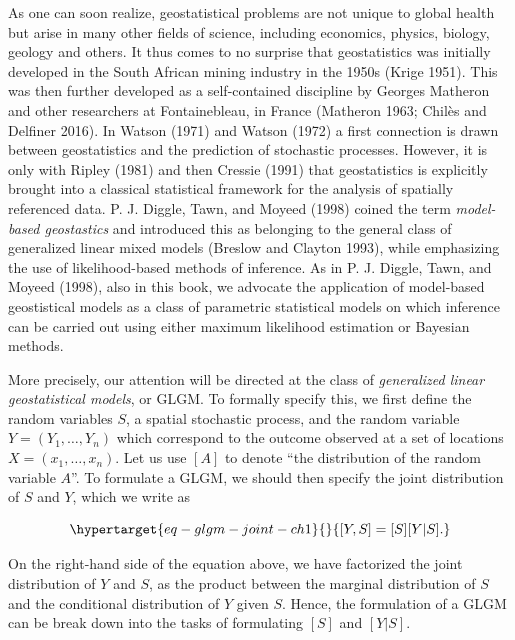 \documentclass[
  letterpaper,
]{krantz}
\begin{document}
As one can soon realize, geostatistical problems are not unique to
global health but arise in many other fields of science, including
economics, physics, biology, geology and others. It thus comes to no
surprise that geostatistics was initially developed in the South African
mining industry in the 1950s (Krige 1951). This was then further
developed as a self-contained discipline by Georges Matheron and other
researchers at Fontainebleau, in France (Matheron 1963; Chilès and
Delfiner 2016). In Watson (1971) and Watson (1972) a first connection is
drawn between geostatistics and the prediction of stochastic processes.
However, it is only with Ripley (1981) and then Cressie (1991) that
geostatistics is explicitly brought into a classical statistical
framework for the analysis of spatially referenced data. P. J. Diggle,
Tawn, and Moyeed (1998) coined the term \emph{model-based geostastics}
and introduced this as belonging to the general class of generalized
linear mixed models (Breslow and Clayton 1993), while emphasizing the
use of likelihood-based methods of inference. As in P. J. Diggle, Tawn,
and Moyeed (1998), also in this book, we advocate the application of
model-based geostistical models as a class of parametric statistical
models on which inference can be carried out using either maximum
likelihood estimation or Bayesian methods.

More precisely, our attention will be directed at the class of
\emph{generalized linear geostatistical models}, or GLGM. To formally
specify this, we first define the random variables \(S\), a spatial
stochastic process, and the random variable \(Y= (Y_1, \ldots, Y_n)\)
which correspond to the outcome observed at a set of locations
\(X = (x_1, \ldots, x_n)\). Let us use \([A]\) to denote ``the
distribution of the random variable \(A\)''. To formulate a GLGM, we
should then specify the joint distribution of \(S\) and \(Y\), which we
write as

\begin{equation}\protect\hypertarget{eq-glgm-joint-ch1}{}{
[Y, S] = [S] [Y | S].
}\label{eq-glgm-joint-ch1}\end{equation}

On the right-hand side of the equation above, we have factorized the
joint distribution of \(Y\) and \(S\), as the product between the
marginal distribution of \(S\) and the conditional distribution of \(Y\)
given \(S\). Hence, the formulation of a GLGM can be break down into the
tasks of formulating \([S]\) and \([Y | S]\).
\end{document}
